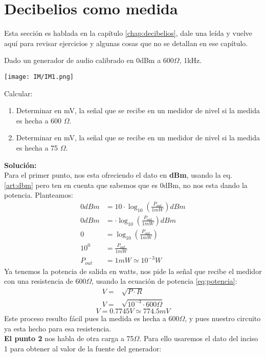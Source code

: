\documentclass[
	12pt, %
	fleqn, %
	a4paper, %
]{LegrandOrangeBook}
\begin{document}
\section{Decibelios como medida}
Esta sección es hablada en la capítulo \ref{chap:decibelios}, dale una leída y vuelve aquí para revisar ejercicios y algunas cosas que no se detallan en ese capítulo.
\begin{example}
\label{exa:01}
Dado un generador de audio calibrado en 0dBm a 600$\Omega$, 1kHz.
\begin{center}
\texttt{[image: IM/IM1.png]}
\end{center}
Calcular:\\
\begin{enumerate}
\item Determinar en mV, la señal que se recibe en un medidor de nivel si la
medida es hecha a 600 $\Omega$.
\item Determinar en mV, la señal que se recibe en un medidor de nivel si la
medida es hecha a 75 $\Omega$.
\end{enumerate}
\textbf{Solución:}\\
Para el primer punto, nos esta ofreciendo el dato en \textbf{dBm}, usando la eq. \ref{art:dbm} pero ten en cuenta que sabemos que es 0dBm, no nos esta dando la potencia. Planteamos:
\begin{align*}
0dBm&=10\cdot\log_{10}\left(\frac{P_{out}}{1mW}\right)dBm\\
0dBm&=\cdot\log_{10}\left(\frac{P_{out}}{1mW}\right)dBm\\
0&=\log_{10}\left(\frac{P_{out}}{1mW}\right)\\
10^0&=\frac{P_{out}}{1mW}\\
P_{out}&=1mW\simeq 10^{-3}W
\end{align*}
Ya tenemos la potencia de salida en watts, nos pide la señal que recibe el medidor con una resistencia de 600$\Omega$, usando la ecuación de potencia \ref{eq:potencia}:
\begin{align*}
V=&\sqrt{P\cdot R}\\
V=&\sqrt{10^{-3}\cdot 600\Omega}
\end{align*}
\begin{equation*}
\boxed{V=0.7745V\simeq 774.5mV}
\end{equation*}
Este proceso resulto fácil pues la medida es hecha a 600$\Omega$, y pues nuestro circuito ya esta hecho para esa resistencia.\\
\textbf{El punto 2} nos habla de otra carga a 75$\Omega$. Para ello usaremos el dato del inciso 1 para obtener al valor de la fuente del generador:

\end{example}
\end{document}
